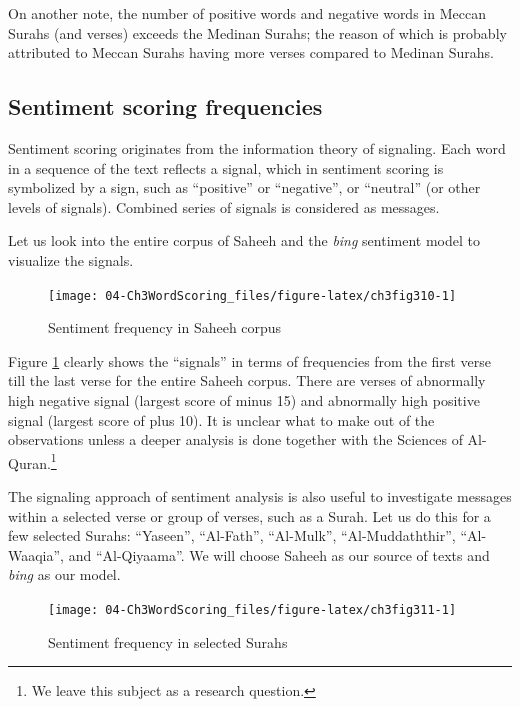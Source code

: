\documentclass[
]{article}
\begin{document}
On another note, the number of positive words and negative words in Meccan Surahs (and verses) exceeds the Medinan Surahs; the reason of which is probably attributed to Meccan Surahs having more verses compared to Medinan Surahs.

\hypertarget{sentiment-scoring-frequencies}{%
\subsection{Sentiment scoring frequencies}\label{sentiment-scoring-frequencies}}

Sentiment scoring originates from the information theory of signaling. Each word in a sequence of the text reflects a signal, which in sentiment scoring is symbolized by a sign, such as ``positive'' or ``negative'', or ``neutral'' (or other levels of signals). Combined series of signals is considered as messages.

Let us look into the entire corpus of Saheeh and the \emph{bing} sentiment model to visualize the signals.

\begin{figure}

{\centering \texttt{[image: 04-Ch3WordScoring\_files/figure-latex/ch3fig310-1]} 

}

\caption{Sentiment frequency in Saheeh corpus}\label{fig:ch3fig310}
\end{figure}

Figure \ref{fig:ch3fig310} clearly shows the ``signals'' in terms of frequencies from the first verse till the last verse for the entire Saheeh corpus. There are verses of abnormally high negative signal (largest score of minus 15) and abnormally high positive signal (largest score of plus 10). It is unclear what to make out of the observations unless a deeper analysis is done together with the Sciences of Al-Quran.\footnote{We leave this subject as a research question.}

The signaling approach of sentiment analysis is also useful to investigate messages within a selected verse or group of verses, such as a Surah. Let us do this for a few selected Surahs: ``Yaseen'', ``Al-Fath'', ``Al-Mulk'', ``Al-Muddaththir'', ``Al-Waaqia'', and ``Al-Qiyaama''. We will choose Saheeh as our source of texts and \emph{bing} as our model.

\begin{figure}

{\centering \texttt{[image: 04-Ch3WordScoring\_files/figure-latex/ch3fig311-1]} 

}

\caption{Sentiment frequency in selected Surahs}\label{fig:ch3fig311}
\end{figure}
\end{document}
